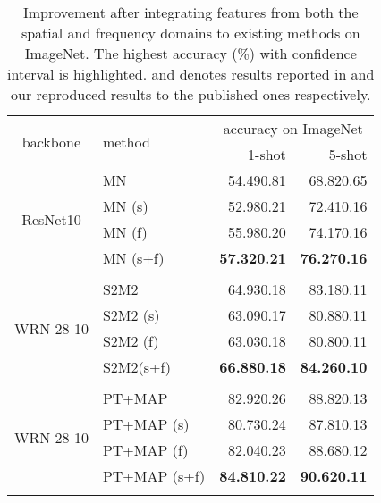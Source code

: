 \documentclass[10pt, conference, compsocconf]{IEEEtran}
\begin{document}
\begin{table}[t]
\centering
\caption{Improvement after integrating features from both the spatial and frequency domains to existing methods on ImageNet. The highest accuracy (\%) with  confidence interval is highlighted.  and   denotes results reported in  \cite{chen2019closer} and our reproduced results to the published ones respectively.}
\begin{tabular}{c|l|rr}
\toprule
\multirow{2}{*}{backbone} & \multirow{2}{*}{method} & \multicolumn{2}{c}{accuracy on ImageNet} \\
& & 1-shot& 5-shot\\ \hline
\multirow{4}{*}{ResNet10}& MN \cite{vinyals2016matching} & 54.490.81 & 68.820.65 \\
 & MN (s) &  52.980.21 & 72.410.16 \\
 & MN (f) &  55.980.20 & 74.170.16 \\ 
& MN (s+f) & \bf{57.320.21} & \bf{76.270.16} \\
&  & &   \\ \hline

\multirow{4}{*}{WRN-28-10}  & S2M2\cite{mangla2020charting} &64.930.18 & 83.180.11 \\
& S2M2 (s) &{}{63.090.17}  &{}{80.880.11} \\
& S2M2 (f)  & 63.030.18  &  80.800.11\\
& S2M2(s+f)  & {}{\bf{66.880.18}}  & {}{\bf{84.260.10}}  \\
&  & {}{}&  {}{} \\ \hline
\multirow{4}{*}{WRN-28-10} & PT+MAP \cite{hu2020leveraging}  & 82.920.26 & 88.820.13 \\
& PT+MAP (s) &{}{80.730.24}&{}{87.810.13}  \\
& PT+MAP (f) &82.040.23 & 88.680.12  \\
& PT+MAP (s+f) &{}{\bf{84.810.22}} & {}{\bf{90.620.11}} \\
&  & {}{}&  {}{} \\ 
\bottomrule
\end{tabular}
\label{table5}
\end{table}
\end{document}
